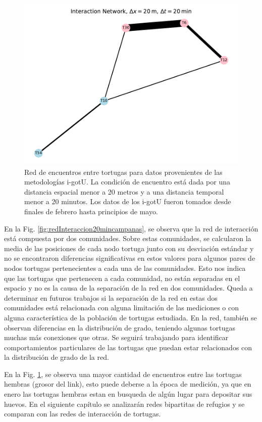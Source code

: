 \begin{figure}[ht]
    \begin{center}
       
   
    \includegraphics[width=\imsize]{Chap2/red_interaccion_20min_IGOTO.pdf}
\end{center}
    \caption[Red de encuentros entre tortugas utilizando i-gotU.]{Red de encuentros entre tortugas para datos provenientes de las metodologías i-gotU. La condición de encuentro está dada por una distancia espacial menor a 20 metros y a una distancia temporal menor a 20 minutos. Los datos de los i-gotU fueron tomados desde finales de febrero hasta principios de mayo.}
    \label{fig:redInteraccion20igotu}
\end{figure}
 
 
En la Fig. \ref{fig:redInteraccion20mincampanas}, se observa que la red de interacción está compuesta por dos comunidades. Sobre estas comunidades, se calcularon la media de las posiciones de cada nodo tortuga junto con su desviación estándar y no se encontraron diferencias significativas en estos valores para algunos pares de nodos tortugas pertenecientes a cada una de las comunidades. Esto nos indica que las tortugas que pertenecen a cada comunidad, no están separadas en el espacio y no es la causa de la separación de la red en dos comunidades. Queda a determinar en futuros trabajos si la separación de la
red en estas dos comunidades está relacionada con alguna limitación de las mediciones o con alguna característica de la población de tortugas estudiada. En la red, también se observan diferencias en la distribución de grado, teniendo algunas tortugas muchas más conexiones que otras. Se seguirá trabajando para identificar comportamientos particulares de las tortugas que puedan estar relacionados con la distribución de grado de la red.
 
En la Fig. \ref{fig:redInteraccion20igotu}, se observa una mayor cantidad de encuentros entre las tortugas hembras (grosor del link), esto puede deberse a la época de medición, ya que en enero las tortugas hembras estan en busqueda de algún lugar para depositar sus huevos. En el siguiente capítulo se analizarán redes bipartitas de refugios y se comparan con las redes de interacción de tortugas.
 
 

